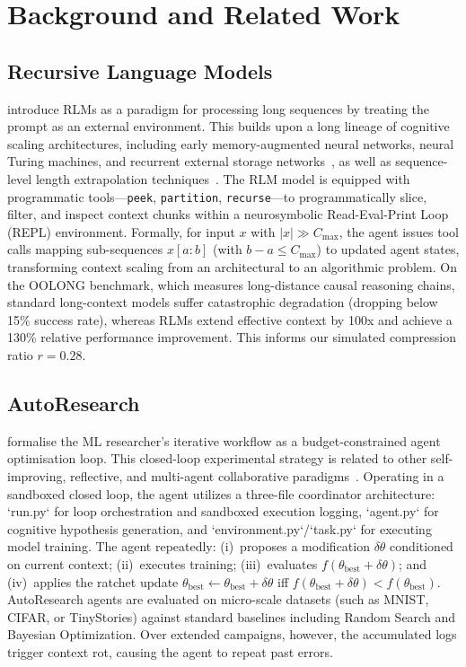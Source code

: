 \documentclass[conference]{IEEEtran}
\newcommand{\Cmax}{C_{\max}}
\newcommand{\tbest}{\theta_{\mathrm{best}}}
\begin{document}
\section{Background and Related Work}
\label{sec:background}

\subsection{Recursive Language Models}
\citet{zhang2025rlm} introduce RLMs as a paradigm for processing long sequences by treating the prompt as an external environment. This builds upon a long lineage of cognitive scaling architectures, including early memory-augmented neural networks, neural Turing machines, and recurrent external storage networks~\citep{weston2014memory,sukhbaatar2015end,graves2014neural}, as well as sequence-level length extrapolation techniques~\citep{dai2019transformer}. The RLM model is equipped with programmatic tools---\texttt{peek}, \texttt{partition}, \texttt{recurse}---to programmatically slice, filter, and inspect context chunks within a neurosymbolic Read-Eval-Print Loop (REPL) environment. Formally, for input $x$ with $|x| \gg \Cmax$, the agent issues tool calls mapping sub-sequences $x[a:b]$ (with $b{-}a \leq \Cmax$) to updated agent states, transforming context scaling from an architectural to an algorithmic problem. On the OOLONG benchmark, which measures long-distance causal reasoning chains, standard long-context models suffer catastrophic degradation (dropping below 15\% success rate), whereas RLMs extend effective context by 100x and achieve a 130\% relative performance improvement. This informs our simulated compression ratio $r{=}0.28$.

\subsection{AutoResearch}
\citet{karpathy2026} formalise the ML researcher's iterative workflow as a budget-constrained agent optimisation loop. This closed-loop experimental strategy is related to other self-improving, reflective, and multi-agent collaborative paradigms~\citep{shinn2023reflexion,wang2023voyager,park2023generative,wu2023autogen}. Operating in a sandboxed closed loop, the agent utilizes a three-file coordinator architecture: `run.py` for loop orchestration and sandboxed execution logging, `agent.py` for cognitive hypothesis generation, and `environment.py`/`task.py` for executing model training. The agent repeatedly: (i)~proposes a modification $\delta\theta$ conditioned on current context; (ii)~executes training; (iii)~evaluates $f(\tbest + \delta\theta)$; and (iv)~applies the ratchet update $\tbest \leftarrow \tbest + \delta\theta$ iff $f(\tbest + \delta\theta) < f(\tbest)$. AutoResearch agents are evaluated on micro-scale datasets (such as MNIST, CIFAR, or TinyStories) against standard baselines including Random Search and Bayesian Optimization. Over extended campaigns, however, the accumulated logs trigger context rot, causing the agent to repeat past errors.
\end{document}
